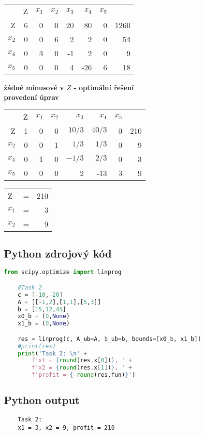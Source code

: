 \documentclass{article}%
\begin{document}
\begin{tabular}{rr|r|rrrrr}
           & Z     & $x_1$ & $x_2$ & $x_3$ & $x_4$ & $x_5$ &       \\
    Z      & 6     & 0     & 0     & 20    & 80    & 0     & 1260  \\
    $x_2$  & 0     & 0     & 6     & 2     & 2     & 0     & 54    \\
    \midrule
    $x_4$  & 0     & 3     & 0     & -1    & 2     & 0     & 9     \\
    \midrule
    $x_5$  & 0     & 0     & 0     & 4     & -26   & 6     & 18    \\
\end{tabular}
\newline
\textbf{
    žádné mínusové v $Z$ - optimální řešení \\
    provedení úprav \\
}

\begin{tabular}{rrrrrrrr}
           & Z     & $x_1$ & $x_2$ & $x_3$  & $x_4$ & $x_5$ &       \\
    Z      & 1     & 0     & 0     & $10/3$ & $40/3$& 0     & 210   \\
    $x_2$  & 0     & 0     & 1     & $1/3$  & $1/3$ & 0     & 9     \\
    $x_4$  & 0     & 1     & 0     & $-1/3$ & $2/3$ & 0     & 3     \\
    $x_5$  & 0     & 0     & 0     & 2      & -13   & 3     & 9     \\
\end{tabular}
\newline

\begin{tabular}{lcr}
    Z & =     & 210 \\
    $x_1$ & =     & 3 \\
    $x_2$ & =     & 9 \\
\end{tabular}

\newpage
\subsection{Python zdrojový kód}
\begin{lstlisting}[language=Python, showstringspaces=false]
    from scipy.optimize import linprog

    #Task 2
    c = [-10,-20]
    A = [[-1,2],[1,1],[5,3]]
    b = [15,12,45]
    x0_b = (0,None)
    x1_b = (0,None)

    res = linprog(c, A_ub=A, b_ub=b, bounds=[x0_b, x1_b])
    #print(res)
    print('Task 2: \n' +
        f'x1 = {round(res.x[0])}, ' +
        f'x2 = {round(res.x[1])}, ' +
        f'profit = {-round(res.fun)}')

\end{lstlisting}

\subsection{Python output}
\begin{lstlisting}
    Task 2:
    x1 = 3, x2 = 9, profit = 210
\end{lstlisting}
\end{document}
